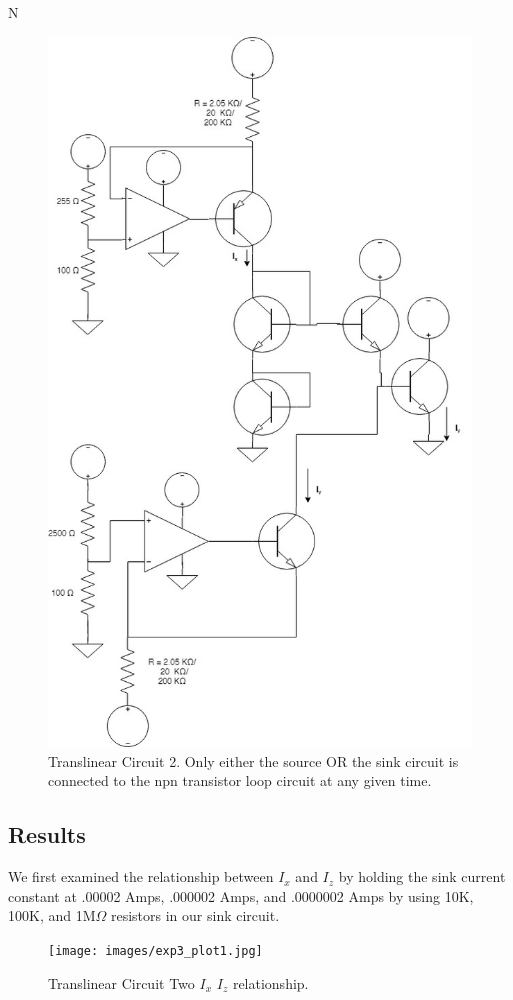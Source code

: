 N\documentclass{article}
\begin{document}
\begin{figure}[H]   
  \centering        
  \includegraphics[scale = 0.5]{images/experiment_three_schematic.jpg}
  \caption{Translinear Circuit 2. Only either the source OR the sink circuit is connected to the npn transistor loop circuit at any given time.} 
  \label{fig:exp1_sch}
\end{figure}

\subsection{Results}
We first examined the relationship between $I_x$ and $I_z$ by holding the sink current constant at .00002 Amps, .000002 Amps, and .0000002 Amps by using 10K, 100K, and 1M$\Omega$ resistors in our sink circuit. 
\begin{figure}[H]   
  \centering        
  \texttt{[image: images/exp3\_plot1.jpg]}
  \caption{Translinear Circuit Two $I_x$ $I_z$ relationship.} 
  \label{fig:exp1_ixiz}
\end{figure}
\end{document}
